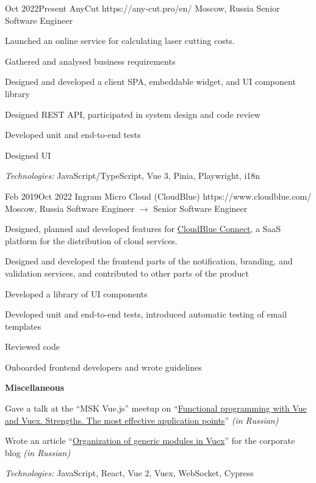 \documentclass[10pt]{article}
\begin{document}
\job
	{Oct 2022}{Present}
	{AnyCut}
	{https://any-cut.pro/en/}
	{Moscow, Russia}
	{Senior Software Engineer}
	{
	  Launched an online service for calculating laser cutting costs.

	  \begin{supercompactitemize}
	  	\item Gathered and analysed business requirements
		\item Designed and developed a client SPA, embeddable widget, and UI component library
		\item Designed REST API, participated in system design and code review
		\item Developed unit and end-to-end tests
		\item Designed UI
	  \end{supercompactitemize}

	  \textit{Technologies:} JavaScript/TypeScript, Vue 3, Pinia, Playwright, i18n
	}

\job
	{Feb 2019}{Oct 2022}
	{Ingram Micro Cloud (CloudBlue)}
	{https://www.cloudblue.com/}
	{Moscow, Russia}
	{Software Engineer $\rightarrow$ Senior Software Engineer}
	{
	  Designed, planned and developed features for \href{https://connect.cloudblue.com/community/}{CloudBlue Connect}, a SaaS platform for the distribution of cloud services.

	  \begin{supercompactitemize}
	  	\item Designed and developed the frontend parts of the notification, branding, and validation services, and contributed to other parts of the product
	  	\item Developed a library of UI components
	  	\item Developed unit and end-to-end tests, introduced automatic testing of email templates
	  	\item Reviewed code
	  	\item Onboarded frontend developers and wrote guidelines
	  \end{supercompactitemize}

	  \textbf{Miscellaneous}

	  \begin{supercompactitemize}
		\item Gave a talk at the ``MSK Vue.js'' meetup on ``\href{https://www.youtube.com/watch?v=Rz_RynHNZKg}{Functional programming with Vue and Vuex. Strengths. The most effective application points}'' \textit{(in Russian)}
		\item Wrote an article ``\href{https://habr.com/ru/company/odin_ingram_micro/blog/526094/}{Organization of generic modules in Vuex}'' for the corporate blog \textit{(in Russian)}
	  \end{supercompactitemize}

	  \textit{Technologies:} JavaScript, React, Vue 2, Vuex, WebSocket, Cypress
	}
\end{document}
